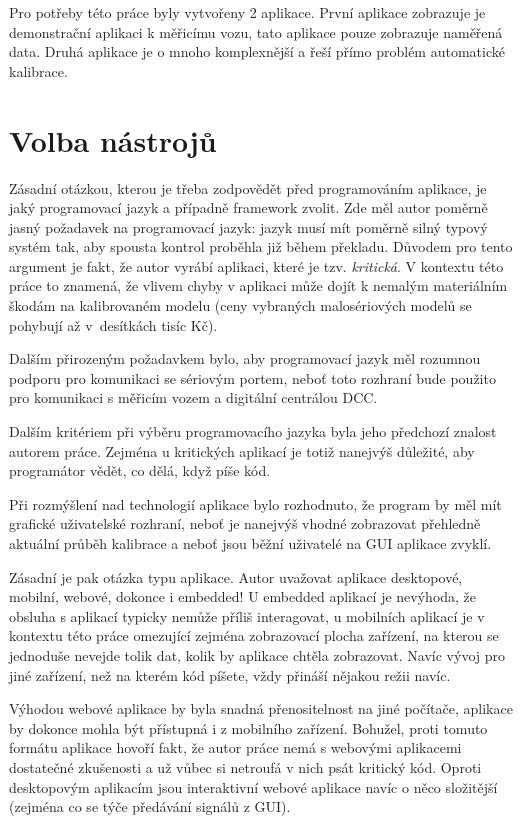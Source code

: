 Pro potřeby této práce byly vytvořeny 2 aplikace. První aplikace zobrazuje je
demonstrační aplikaci k měřicímu vozu, tato aplikace pouze zobrazuje naměřená
data. Druhá aplikace je o mnoho komplexnější a řeší přímo problém automatické
kalibrace.

\section{Volba nástrojů}

Zásadní otázkou, kterou je třeba zodpovědět před programováním aplikace, je
jaký programovací jazyk a případně framework zvolit. Zde měl autor poměrně
jasný požadavek na programovací jazyk: jazyk musí mít poměrně silný typový
systém tak, aby spousta kontrol proběhla již během překladu. Důvodem pro tento
argument je fakt, že autor vyrábí aplikaci, které je tzv. \textit{kritická}.
V kontextu této práce to znamená, že vlivem chyby v aplikaci může dojít
k nemalým materiálním škodám na kalibrovaném modelu (ceny vybraných
malosériových modelů se pohybují až v~desítkách tisíc Kč).

Dalším přirozeným požadavkem bylo, aby programovací jazyk měl rozumnou podporu
pro komunikaci se sériovým portem, neboť toto rozhraní bude použito pro
komunikaci s měřicím vozem a digitální centrálou DCC.

Dalším kritériem při výběru programovacího jazyka byla jeho předchozí znalost
autorem práce. Zejména u kritických aplikací je totiž nanejvýš důležité, aby
programátor vědět, co dělá, když píše kód.

Při rozmýšlení nad technologií aplikace bylo rozhodnuto, že program by měl
mít grafické uživatelské rozhraní, neboť je nanejvýš vhodné zobrazovat přehledně
aktuální průběh kalibrace a neboť jsou běžní uživatelé na GUI aplikace zvyklí.

Zásadní je pak otázka typu aplikace. Autor uvažovat aplikace desktopové,
mobilní, webové, dokonce i embedded! U embedded aplikací je nevýhoda, že
obsluha s aplikací typicky nemůže příliš interagovat, u mobilních aplikací
je v kontextu této práce omezující zejména zobrazovací plocha zařízení, na
kterou se jednoduše nevejde tolik dat, kolik by aplikace chtěla zobrazovat.
Navíc vývoj pro jiné zařízení, než na kterém kód píšete, vždy přináší nějakou
režii navíc.

Výhodou webové aplikace by byla snadná přenositelnost na jiné počítače,
aplikace by dokonce mohla být přístupná i z mobilního zařízení. Bohužel, proti
tomuto formátu aplikace hovoří fakt, že autor práce nemá s webovými aplikacemi
dostatečné zkušenosti a už vůbec si netroufá v nich psát kritický kód.
Oproti desktopovým aplikacím jsou interaktivní webové aplikace navíc o něco
složitější (zejména co se týče předávání signálů z GUI).

